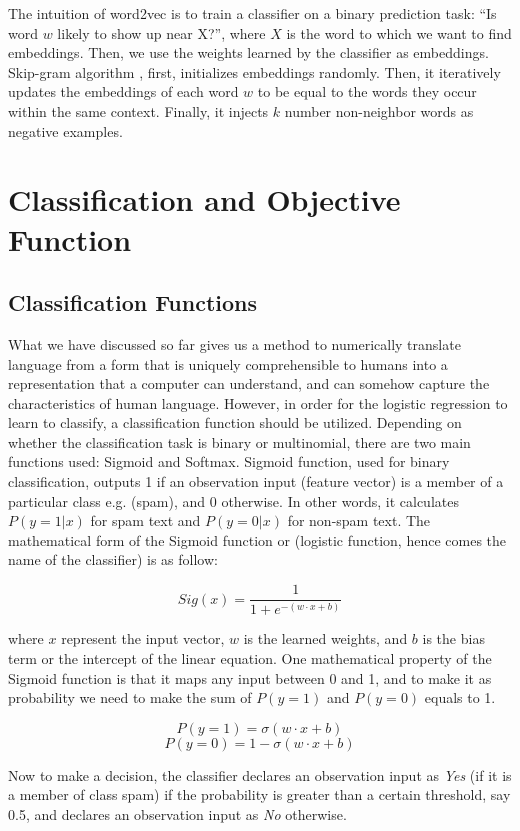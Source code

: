 The intuition of word2vec is to train a classifier on a binary prediction task: “Is
word $w$ likely to show up near X?”, where $X$ is the word to which we want to find embeddings. Then, we use the weights learned by the classifier as embeddings. Skip-gram algorithm \citep{mikolov2013distributed} , first, initializes embeddings randomly. Then, it iteratively updates the embeddings of each word $w$ to be equal to the words they occur within the same context. Finally, it injects $k$ number non-neighbor words as negative examples. 

\section{Classification and Objective Function}
\subsection{Classification Functions}
What we have discussed so far gives us a method to numerically translate language from a form that is uniquely comprehensible to humans into a representation that a computer can understand, and can somehow capture the characteristics of human language. However, in order for the logistic regression to learn to classify, a classification function should be utilized. Depending on whether the classification task is binary or multinomial, there are two main functions used: Sigmoid and Softmax. Sigmoid function, used for binary classification, outputs 1 if an observation input (feature vector) is a member of a particular class e.g. (spam), and 0 otherwise. In other words, it calculates $P(y=1|x)$ for spam text and $P(y=0|x)$ for non-spam text. The mathematical form of the Sigmoid function or (logistic function, hence comes the name of the classifier) is as follow:

$$Sig ( x ) = \frac { 1 } { 1 + e ^ { - (w \cdot x +b)} }$$ 

where $x$ represent the input vector, $w$ is the learned weights, and $b$ is the bias term or the intercept of the linear equation. One mathematical property of the Sigmoid function is that it maps any input between 0 and 1, and to make it as probability we need to make the sum of $P(y=1)$ and $P(y=0)$ equals to 1. 

$$ P ( y = 1 ) = \sigma ( w \cdot x + b ) $$
$$ P ( y = 0 ) = 1 - \sigma ( w \cdot x + b ) $$

Now to make a decision, the classifier declares an observation input as \emph{Yes} (if it is a member of class spam) if the probability is greater than a certain threshold, say 0.5, and declares an observation input as \emph{No} otherwise. 

